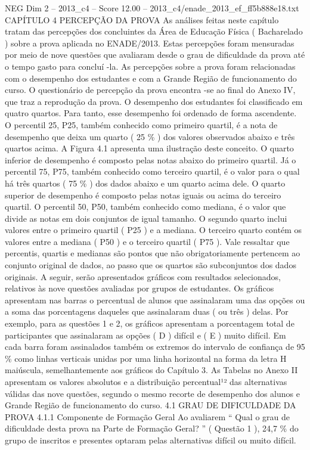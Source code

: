 \begin{textsample}{NEG Dim 2 – 2013\_c4 – Score 12.00 – 2013\_c4/enade\_2013\_ef\_ff5b888e18.txt}  \label{ex:f2_neg_370}
CAPÍTULO 4 PERCEPÇÃO DA PROVA As análises feitas neste capítulo tratam das percepções dos concluintes da Área de Educação Física ( Bacharelado ) sobre a prova aplicada no ENADE/2013.
Estas percepções foram mensuradas por meio de nove questões que avaliaram desde o grau de dificuldade da prova até o tempo gasto para concluí -la.
As percepções sobre a prova foram relacionadas com o desempenho dos estudantes e com a Grande Região de funcionamento do curso.
O questionário de percepção da prova encontra -se ao final do Anexo IV, que traz a reprodução da prova.
O desempenho dos estudantes foi classificado em quatro quartos.
Para tanto, esse desempenho foi ordenado de forma ascendente.
O percentil 25, P25, também conhecido como primeiro quartil, é a nota de desempenho que deixa um quarto ( 25 \% ) dos valores observados abaixo e três quartos acima.
A Figura 4.1 apresenta uma ilustração deste conceito.
O quarto inferior de desempenho é composto pelas notas abaixo do primeiro quartil.
Já o percentil 75, P75, também conhecido como terceiro quartil, é o valor para o qual há três quartos ( 75 \% ) dos dados abaixo e um quarto acima dele.
O quarto superior de desempenho é composto pelas notas iguais ou acima do terceiro quartil.
O percentil 50, P50, também conhecido como mediana, é o valor que divide as notas em dois conjuntos de igual tamanho.
O segundo quarto inclui valores entre o primeiro quartil ( P25 ) e a mediana.
O terceiro quarto contém os valores entre a mediana ( P50 ) e o terceiro quartil ( P75 ).
Vale ressaltar que percentis, quartis e medianas são pontos que não obrigatoriamente pertencem ao conjunto original de dados, ao passo que os quartos são subconjuntos dos dados originais.
A seguir, serão apresentados gráficos com resultados selecionados, relativos às nove questões avaliadas por grupos de estudantes.
Os gráficos apresentam nas barras o percentual de alunos que assinalaram uma das opções ou a soma das porcentagens daqueles que assinalaram duas ( ou três ) delas.
Por exemplo, para as questões 1 e 2, os gráficos apresentam a porcentagem total de participantes que assinalaram as opções ( D ) difícil e ( E ) muito difícil.
Em cada barra foram assinalados também os extremos do intervalo de confiança de 95 \% como linhas verticais unidas por uma linha horizontal na forma da letra H maiúscula, semelhantemente aos gráficos do Capítulo 3.
As Tabelas no Anexo II apresentam os valores absolutos e a distribuição percentual¹² das alternativas válidas das nove questões, segundo o mesmo recorte de desempenho dos alunos e Grande Região de funcionamento do curso. 4.1 GRAU DE DIFICULDADE DA PROVA 4.1.1 Componente de Formação Geral Ao avaliarem “ Qual o grau de dificuldade desta prova na Parte de Formação Geral? ” ( Questão 1 ), 24,7 \% do grupo de inscritos e presentes optaram pelas alternativas difícil ou muito difícil.

\end{textsample}
